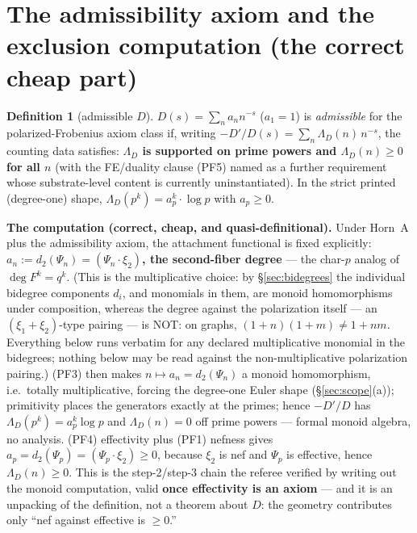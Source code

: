 \documentclass[11pt]{article}
\theoremstyle{plain}
\theoremstyle{definition}
\newtheorem{definition}[theorem]{Definition}
\theoremstyle{remark}
\begin{document}
\section{The admissibility axiom and the exclusion computation (the correct
cheap part)}\label{sec:admissibility}

\begin{definition}[admissible $D$]\label{def:admissible}
$D(s) = \sum_n a_n n^{-s}$ ($a_1 = 1$) is \emph{admissible} for the
polarized-Frobenius axiom class if, writing
$-D'/D(s) = \sum_n \Lambda_D(n)\, n^{-s}$, the counting data satisfies:
\textbf{$\Lambda_D$ is supported on prime powers and $\Lambda_D(n) \ge 0$ for
all $n$} (with the FE/duality clause (PF5) named as a further requirement whose
substrate-level content is currently uninstantiated). In the strict printed
(degree-one) shape, $\Lambda_D(p^k) = a_p^k \cdot \log p$ with $a_p \ge 0$.
\end{definition}

\noindent\textbf{The computation (correct, cheap, and quasi-definitional).}
Under Horn~A plus the admissibility axiom, the attachment functional is fixed
explicitly: \textbf{$a_n := d_2(\Psi_n) = (\Psi_n \cdot \xi_2)$, the
second-fiber degree} --- the char-$p$ analog of $\deg F^k = q^k$. (This is the
multiplicative choice: by \S\ref{sec:bidegrees} the individual bidegree
components $d_i$, and monomials in them, are monoid homomorphisms under
composition, whereas the degree against the polarization itself --- an
$(\xi_1 + \xi_2)$-type pairing --- is NOT: on graphs,
$(1+n)(1+m) \ne 1 + nm$. Everything below runs verbatim for any declared
multiplicative monomial in the bidegrees; nothing below may be read against the
non-multiplicative polarization pairing.) (PF3) then makes
$n \mapsto a_n = d_2(\Psi_n)$ a monoid homomorphism, i.e.\ totally
multiplicative, forcing the degree-one Euler shape (\S\ref{sec:scope}(a));
primitivity places the generators exactly at the primes; hence $-D'/D$ has
$\Lambda_D(p^k) = a_p^k \log p$ and $\Lambda_D(n) = 0$ off prime powers ---
formal monoid algebra, no analysis. (PF4) effectivity plus (PF1) nefness gives
$a_p = d_2(\Psi_p) = (\Psi_p \cdot \xi_2) \ge 0$, because $\xi_2$ is nef and
$\Psi_p$ is effective, hence $\Lambda_D(n) \ge 0$. This is the step-2/step-3
chain the referee verified by writing out the monoid computation, valid
\textbf{once effectivity is an axiom} --- and it is an unpacking of the
definition, not a theorem about $D$: the geometry contributes only ``nef
against effective is $\ge 0$.''
\end{document}
